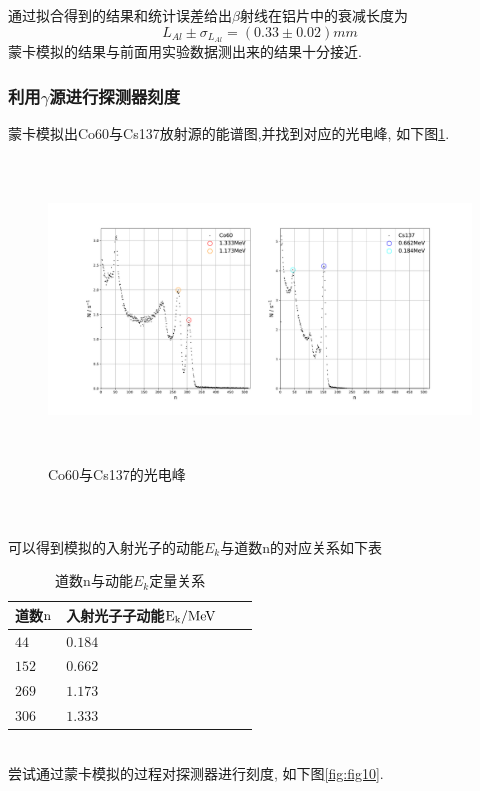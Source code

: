 \documentclass[a4paper]{article}
\begin{document}
通过拟合得到的结果和统计误差给出$\beta$射线在铝片中的衰减长度为
\begin{equation}
    L_{Al}\pm\sigma_{L_{Al}}=(0.33\pm0.02)mm
\end{equation}
蒙卡模拟的结果与前面用实验数据测出来的结果十分接近.
\newpage
\subsubsection{利用$\gamma$源进行探测器刻度}
蒙卡模拟出Co60与Cs137放射源的能谱图,并找到对应的光电峰, 如下图\ref{fig:fig9}. 
\begin{figure}[ht]
 \centering
 \includegraphics[height=8cm, width=16cm]{images/phyex4_fig1.pdf}
 \caption{Co60与Cs137的光电峰}
 \label{fig:fig9}
\end{figure}\\\\
可以得到模拟的入射光子的动能$E_k$与道数n的对应关系如下表
\begin{table}[htp]
\caption{道数n与动能$E_k$定量关系}\label{tab:signaldef}
\begin{center}\begin{tabular}{|l|l|l|p{6cm}|}
	\hline
	\textbf{道数$\rm n$} & \textbf{入射光子子动能$\rm E_k/MeV$}\\ \hline \hline
	$44$    & $0.184$ 	\\ \hline
	$152$    & $0.662$    \\ \hline
	$269$    & $1.173$    \\ \hline
	$306$    & $1.333$    \\ \hline
	\hline
	\end{tabular}
\end{center}
\end{table}\\
\newpage
尝试通过蒙卡模拟的过程对探测器进行刻度, 如下图\ref{fig:fig10}. 
\end{document}
